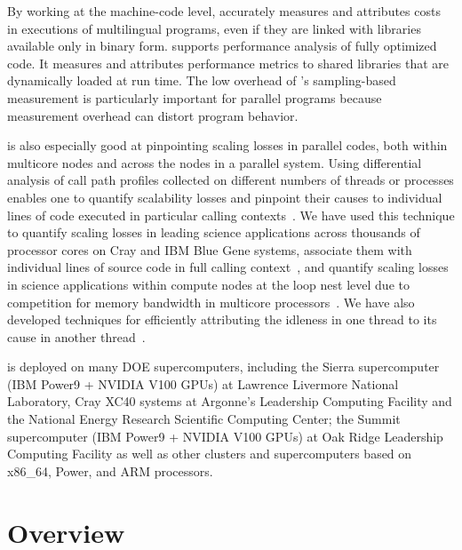 \documentclass[11pt,twoside,letterpaper]{report}
\begin{document}
By working at the machine-code level, \HPCToolkit{} accurately measures and attributes costs in executions of multilingual programs, even if they are linked with libraries available only in binary form.
\HPCToolkit{} supports performance analysis of fully optimized code.
It measures and attributes performance metrics to shared libraries that are dynamically loaded at run time.
The low overhead of \HPCToolkit{}'s sampling-based measurement is particularly important
for parallel programs because measurement overhead can distort program behavior.

\HPCToolkit{} is also especially good at pinpointing scaling losses in parallel codes, both within multicore nodes and across the nodes in a parallel system.
Using differential analysis of call path profiles collected on different numbers of threads or processes enables one to quantify scalability losses and pinpoint their causes to individual lines of code executed in particular calling contexts~\cite{Coarfa-MC:2007:ICS-scalability}.
We have used this technique to quantify scaling losses in leading science applications across thousands of processor cores on Cray and IBM Blue Gene systems, associate them with individual lines of source code in full calling context~\cite{Tallent-MC-etal:2009:SC-hpctoolkit-petascale,Tallent-MC-etal:2010:SC-hpctoolkit-load-imbalance}, and quantify scaling losses in science applications within compute nodes at the loop nest level due to competition for memory bandwidth in multicore processors~\cite{Tallent-etal:2008:SciDAC-hpctoolkit}.
We have also developed techniques for efficiently attributing the idleness in one thread to its cause in another thread~\cite{Tallent-MC:2009:PPoPP-hpctoolkit-work-stealing,Tallent-MC-Porterfield:2010:PPoPP-hpctoolkit-lock-contention}.

\HPCToolkit{} is deployed on many DOE supercomputers, including
the Sierra supercomputer (IBM Power9 + NVIDIA V100 GPUs) at Lawrence Livermore National Laboratory,
Cray XC40 systems at Argonne's Leadership Computing Facility and the National Energy
Research Scientific Computing Center; the Summit supercomputer (IBM Power9 + NVIDIA V100 GPUs) at Oak Ridge Leadership Computing Facility
as well as other clusters and supercomputers based on x86\_64, Power, and ARM processors.

\cleardoublepage
\chapter{\HPCToolkit{} Overview}
\end{document}
